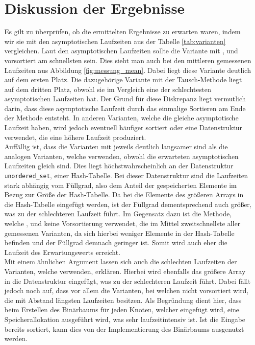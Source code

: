 \section{Diskussion der Ergebnisse}
Es gilt zu überprüfen, ob die ermittelten Ergebnisse zu erwarten waren, indem wir sie 
mit den asymptotischen Laufzeiten aus der Tabelle \ref{tab:varianten} vergleichen.
Laut den asymptotischen Laufzeiten sollte die Variante mit \SorSor{}, \distr{} und vorsortiert am schnellsten
sein. Dies sieht man auch bei den mittleren gemessenen Laufzeiten aus Abbildung \ref{fig:messung_mean}.
Dabei liegt diese Variante deutlich auf dem ersten Platz. Die dazugehörige Variante mit
der Tausch-Methode \perm{} liegt auf dem dritten Platz, obwohl sie im Vergleich eine der
schlechtesten asymptotischen Laufzeiten hat. Der Grund für diese Diskrepanz 
liegt vermutlich darin, dass diese
asymptotische Laufzeit durch das einmalige Sortieren am Ende der Methode entsteht. 
In anderen Varianten, welche die gleiche asymptotische Laufzeit haben, wird jedoch eventuell häufiger
sortiert oder eine Datenstruktur verwendet, die eine höhere Laufzeit produziert.
\\

Auffällig ist, dass die Varianten mit \USetSea{} jeweils deutlich langsamer sind als die analogen
Varianten, welche \SeaUSet{} verwenden, obwohl die erwarteten asymptotischen Laufzeiten
gleich sind. Dies liegt höchstwahrscheinlich an der
Datenstruktur \texttt{unordered\_set}, einer Hash-Tabelle. Bei dieser Datenstruktur
sind die Laufzeiten stark abhängig vom Füllgrad, also dem Anteil der 
gespeicherten Elemente im Bezug zur Größe der Hash-Tabelle. Da bei \USetSea{} die Elemente
des größeren Arrays in die Hash-Tabelle eingefügt werden, ist der Füllgrad dementsprechend
auch größer, was zu der schlechteren Laufzeit führt.
Im Gegensatz dazu ist die Methode, welche \SeaUSet, \perm{} und keine Vorsortierung verwendet,
die im Mittel zweitschnellste aller gemessenen Varianten, da sich hierbei
weniger Elemente in der Hash-Tabelle befinden und der Füllgrad demnach geringer ist. 
Somit wird auch eher die Laufzeit des Erwartungswerts erreicht.
\\

Mit einem ähnlichen Argument lassen sich auch die schlechten Laufzeiten 
der Varianten, welche \SetSea{} verwenden, erklären. Hierbei wird ebenfalls das größere
Array in die Datenstruktur eingefügt, was zu der schlechteren Laufzeit führt.  
Dabei fällt jedoch noch auf, dass vor allem die Varianten, 
bei welchen nicht vorsortiert wird, die mit Abstand längsten Laufzeiten besitzen. Als Begründung 
dient hier, dass beim Erstellen des Binärbaums für jeden Knoten, welcher eingefügt wird,
eine Speicherallokation ausgeführt wird, was sehr laufzeitintensiv ist. Ist die
Eingabe bereits sortiert, kann dies von der Implementierung des Binärbaums ausgenutzt werden.
\\


